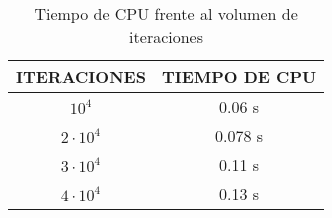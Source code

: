 \begin{table}
\end{table}
\begin{table}[H]
\begin{center}
\begin{tabular}{|c|c|}

   \hline
   \textbf{ITERACIONES}  & \textbf{TIEMPO DE CPU} \\ \hline
   $10^{4}$              & 0.06 s                 \\ \hline
   $2 \cdot 10^{4}$      & 0.078 s                \\ \hline
   $3 \cdot 10^{4}$      & 0.11 s                 \\ \hline
   $4 \cdot 10^{4}$      & 0.13 s                 \\ \hline


\end{tabular}
\end{center}
\caption{Tiempo de CPU frente al volumen de iteraciones}
\label{cputable}
\end{table}
